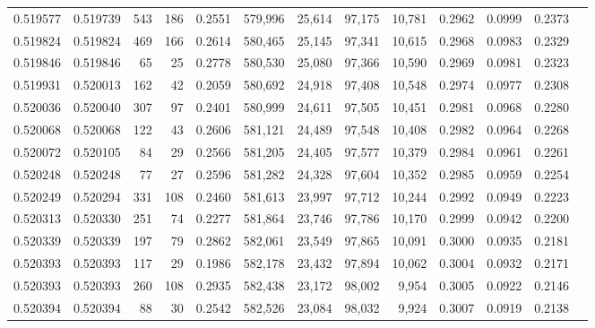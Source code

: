 \begin{tabular}{rrrrrrrrrrrrr}
0.519577 & 0.519739 &   543 &   186 &                                     0.2551 & 579,996 &  25,614 &  97,175 &  10,781 & 0.2962 & 0.0999 & 0.2373 \\
0.519824 & 0.519824 &   469 &   166 &                                     0.2614 & 580,465 &  25,145 &  97,341 &  10,615 & 0.2968 & 0.0983 & 0.2329 \\
0.519846 & 0.519846 &    65 &    25 &                                     0.2778 & 580,530 &  25,080 &  97,366 &  10,590 & 0.2969 & 0.0981 & 0.2323 \\
0.519931 & 0.520013 &   162 &    42 &                                     0.2059 & 580,692 &  24,918 &  97,408 &  10,548 & 0.2974 & 0.0977 & 0.2308 \\
0.520036 & 0.520040 &   307 &    97 &                                     0.2401 & 580,999 &  24,611 &  97,505 &  10,451 & 0.2981 & 0.0968 & 0.2280 \\
0.520068 & 0.520068 &   122 &    43 &                                     0.2606 & 581,121 &  24,489 &  97,548 &  10,408 & 0.2982 & 0.0964 & 0.2268 \\
0.520072 & 0.520105 &    84 &    29 &                                     0.2566 & 581,205 &  24,405 &  97,577 &  10,379 & 0.2984 & 0.0961 & 0.2261 \\
0.520248 & 0.520248 &    77 &    27 &                                     0.2596 & 581,282 &  24,328 &  97,604 &  10,352 & 0.2985 & 0.0959 & 0.2254 \\
0.520249 & 0.520294 &   331 &   108 &                                     0.2460 & 581,613 &  23,997 &  97,712 &  10,244 & 0.2992 & 0.0949 & 0.2223 \\
0.520313 & 0.520330 &   251 &    74 &                                     0.2277 & 581,864 &  23,746 &  97,786 &  10,170 & 0.2999 & 0.0942 & 0.2200 \\
0.520339 & 0.520339 &   197 &    79 &                                     0.2862 & 582,061 &  23,549 &  97,865 &  10,091 & 0.3000 & 0.0935 & 0.2181 \\
0.520393 & 0.520393 &   117 &    29 &                                     0.1986 & 582,178 &  23,432 &  97,894 &  10,062 & 0.3004 & 0.0932 & 0.2171 \\
0.520393 & 0.520393 &   260 &   108 &                                     0.2935 & 582,438 &  23,172 &  98,002 &   9,954 & 0.3005 & 0.0922 & 0.2146 \\
0.520394 & 0.520394 &    88 &    30 &                                     0.2542 & 582,526 &  23,084 &  98,032 &   9,924 & 0.3007 & 0.0919 & 0.2138 \\

\end{tabular}
